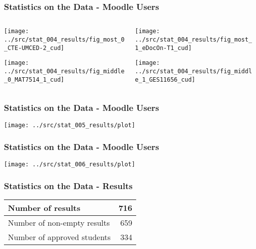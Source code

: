 \begin{frame}
\frametitle{Statistics on the Data - Moodle Users}


\begin{columns}[T] %
\begin{column}{.48\textwidth}
    \texttt{[image: ../src/stat\_004\_results/fig\_most\_0\_CTE-UMCED-2\_cud]}

    \texttt{[image: ../src/stat\_004\_results/fig\_middle\_0\_MAT7514\_1\_cud]}
\end{column}%
\hfill%
\begin{column}{.48\textwidth}
    \texttt{[image: ../src/stat\_004\_results/fig\_most\_1\_eDocOn-T1\_cud]}

    \texttt{[image: ../src/stat\_004\_results/fig\_middle\_1\_GES11656\_cud]}
\end{column}%
\end{columns}
\end{frame}

\begin{frame}
\frametitle{Statistics on the Data - Moodle Users}
\centering


\texttt{[image: ../src/stat\_005\_results/plot]}
\end{frame}

\begin{frame}
\frametitle{Statistics on the Data - Moodle Users}
\centering


\texttt{[image: ../src/stat\_006\_results/plot]}
\end{frame}

\begin{frame}
\frametitle{Statistics on the Data - Results}

{

\center

\begin{tabular}{| l | r |}
    \hline
    Number of results           & 716 \\ \hline
    Number of non-empty results & 659  \\ \hline
    Number of approved students & 334 \\ \hline
\end{tabular}

}

\end{frame}
